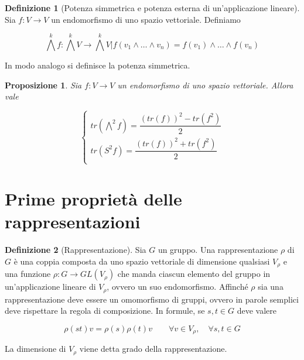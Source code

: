 \documentclass[11pt]{article}
\theoremstyle{plain}
\newtheorem{prop}[thm]{Proposizione}
\theoremstyle{definition}
\newtheorem{defn}{Definizione}[section]
\theoremstyle{remark}
\begin{document}
\begin{defn}[Potenza simmetrica e potenza esterna di un'applicazione lineare]

Sia $f: V\to V$ un endomorfismo di uno spazio vettoriale. Definiamo 

\[\bigwedge^k f : \bigwedge^k V \to \bigwedge^k V | f(v_1 \wedge \ldots \wedge v_n) = f(v_1) \wedge \ldots \wedge f(v_n) \]

In modo analogo si definisce la potenza simmetrica.


\end{defn}




\begin{prop}
Sia $f: V \to V$ un endomorfismo di uno spazio vettoriale. Allora vale

\[ 
\begin{cases}
tr(\bigwedge^2 f ) = \dfrac{(tr(f))^2 - tr(f^2)}{2} \\
tr(S^2 f ) = \dfrac{(tr(f))^2 + tr(f^2)}{2} \\
\end{cases}
\]



\end{prop}
















\newpage
\section{Prime proprietà delle rappresentazioni}

\begin{defn}[Rappresentazione] Sia $G$ un gruppo. Una rappresentazione $\rho$ di $G$ è una coppia composta da uno spazio vettoriale di dimensione qualsiasi $V_\rho$ e una funzione $\rho: G \to GL(V_\rho)$ che manda ciascun elemento del gruppo in un'applicazione lineare di $V_\rho$, ovvero un suo endomorfismo. Affinché $\rho$ sia una rappresentazione deve essere un omomorfismo di gruppi, ovvero in parole semplici deve rispettare la regola di composizione. In formule, se $s, t \in G$ deve valere

\[ \rho(st) v = \rho(s)\rho(t) v \qquad \forall v \in V_\rho, \quad \forall s,t \in G\]

La dimensione di $V_\rho$ viene detta grado della rappresentazione.

\end{defn}
\end{document}

